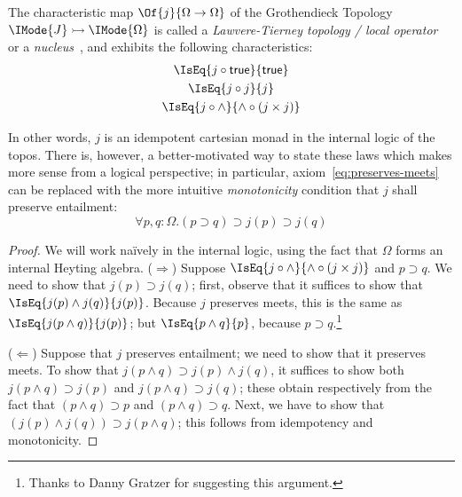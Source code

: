 \documentclass{article}
\newcommand\Mono[2]{#1\rightarrowtail{#2}}
\newcommand\True{\mathsf{true}}
\begin{document}
\begin{definition}\label{def:lawvere-tierney}
The characteristic map $\Of{j}{\Omega\to\Omega}$ of the Grothendieck
Topology $\Mono{\IMode{J}}{\IMode{\Omega}}$ is called a
\emph{Lawvere-Tierney topology / local
  operator}~\cite{maclane-moerdijk:1992} or a
\emph{nucleus}~\cite{jacobs:1999}, and exhibits the following
characteristics:
\begin{gather}
  \IsEq{j\circ\True}{\True}
  \label{eq:preserves-true}
  \\
  \IsEq{j\circ j}{j}
  \label{eq:idempotency}
  \\
  \IsEq{j\circ\land}{\land\circ(j\times j)}
  \label{eq:preserves-meets}
\end{gather}
\end{definition}

In other words, $j$ is an idempotent cartesian monad in the internal
logic of the topos. There is, however, a better-motivated way to state
these laws which makes more sense from a logical perspective; in
particular, axiom~\ref{eq:preserves-meets} can be replaced with the
more intuitive \emph{monotonicity} condition that $j$ shall preserve
entailment:
\begin{equation}
  \forall p,q:\Omega. (p\supset q) \supset  j(p)\supset j(q)
  \tag{3.3*}
  \label{eq:monotonicity}
\end{equation}

\begin{proof}
  We will work na\"ively in the internal logic, using the fact that
  $\Omega$ forms an internal Heyting algebra. ($\Rightarrow$) Suppose
  $\IsEq{j\circ\land}{\land\circ(j\times j)}$ and $p\supset q$. We
  need to show that $j(p) \supset j(q)$; first, observe that it
  suffices to show that $\IsEq{j(p)\land j(q)}{j(p)}$. Because $j$
  preserves meets, this is the same as $\IsEq{j(p\land q)}{j(p)}$; but
  $\IsEq{p\land q}{p}$, because $p\supset q$.\footnote{Thanks to Danny
    Gratzer for suggesting this argument.}

  ($\Leftarrow$) Suppose that $j$ preserves entailment; we need to
  show that it preserves meets. To show that
  $j(p\land q)\supset j(p)\land j(q)$, it suffices to show both
  $j(p\land q)\supset j(p)$ and $j(p\land q)\supset j(q)$; these
  obtain respectively from the fact that $(p\land q)\supset p$ and
  $(p\land q)\supset q$. Next, we have to show that
  $(j(p)\land j(q))\supset j(p\land q)$; this follows from idempotency
  and monotonicity.
\end{proof}
\end{document}
